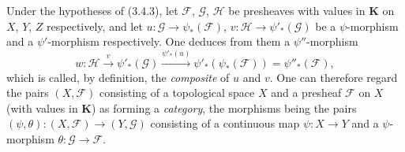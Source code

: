 \begin{env}[3.5.2]
\label{0.3.5.2}
Under the hypotheses of (3.4.3), let $\mathcal{F}$, $\mathcal{G}$,
$\mathcal{H}$ be presheaves with values in $\mathbf{K}$ on $X$, $Y$, $Z$
respectively, and let
$u:\mathcal{G}\to\psi_*(\mathcal{F})$,
$v:\mathcal{H}\to\psi'_*(\mathcal{G})$ be a $\psi$-morphism and a
$\psi'$-morphism respectively. One deduces from them a $\psi''$-morphism
\[
  w:\mathcal{H}\xrightarrow{v}\psi'_*(\mathcal{G})
  \xrightarrow{\psi'_*(u)}
  \psi'_*(\psi_*(\mathcal{F}))=\psi''_*(\mathcal{F}),
\]
which is called, by definition, the \emph{composite} of $u$ and $v$. One can
therefore regard the pairs $(X,\mathcal{F})$ consisting of a topological space
$X$ and a presheaf $\mathcal{F}$ on $X$ (with values in $\mathbf{K}$)
as forming a \emph{category}, the morphisms being the pairs
$(\psi,\theta):(X,\mathcal{F})\to(Y,\mathcal{G})$ consisting of a continuous
map $\psi:X\to Y$ and a $\psi$-morphism
$\theta:\mathcal{G}\to\mathcal{F}$.
\end{env}

